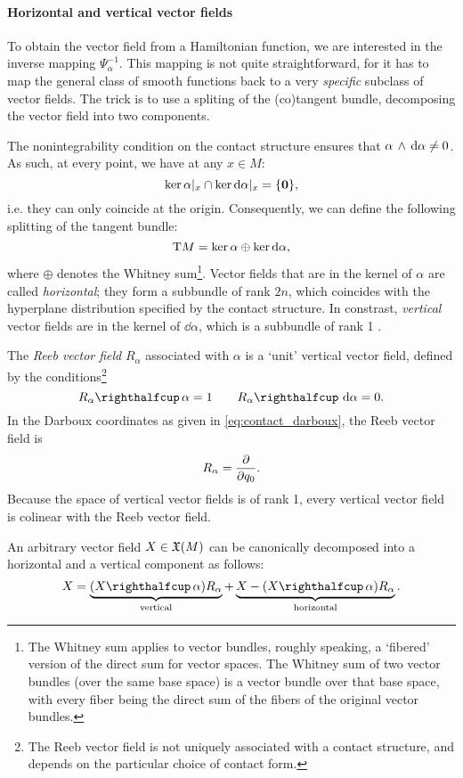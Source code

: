 \paragraph{Horizontal and vertical vector fields} To obtain the vector field from a Hamiltonian function, we are interested in the inverse mapping $\Psi^{-1}_\alpha$. This mapping is not quite straightforward, for it has to map the general class of smooth functions back to a very \emph{specific} subclass of vector fields. The trick is to use a spliting of the (co)tangent bundle, decomposing the vector field into two components. 

The nonintegrability condition on the contact structure ensures that $ \alpha\,\wedge\,\dd{\alpha}  \neq 0$. As such, at every point, we have at any $x\in M$:
$$ \ker{\alpha}\vert_x \cap \ker{\dd{\alpha}}\vert_x = \qty{\mathbf{0}}, $$
i.e. they can only coincide at the origin. Consequently, we can define the following splitting of the tangent bundle:
$$ \mathrm{T}M = \ker{\alpha}\oplus\ker{\dd{\alpha}}, $$
where $\oplus$ denotes the Whitney sum\footnote{The Whitney sum applies to vector bundles, roughly speaking, a `fibered' version of the direct sum for vector spaces. The Whitney sum of two vector bundles (over the same base space) is a vector bundle over that base space, with every fiber being the direct sum of the fibers of the original vector bundles.}. Vector fields that are in the kernel of $\alpha$ are called \emph{horizontal}; they form a subbundle of rank $2n$, which coincides with the hyperplane distribution specified by the contact structure. In constrast, \emph{vertical} vector fields are in the kernel of $\dd{\alpha}$, which is a subbundle of rank 1 \cite{Libermann1987}.

The \emph{Reeb vector field} $R_\alpha$ associated with $\alpha$ is a `unit' vertical vector field, defined by the conditions\footnote{The Reeb vector field is not uniquely associated with a contact structure, and depends on the particular choice of contact form.}
    $$ \intpr{R_\alpha}{\alpha} = 1 \qquad \intpr{R_\alpha}{\dd{\alpha}} = 0.$$
In the Darboux coordinates as given in \cref{eq:contact_darboux}, the Reeb vector field is
    $$ R_\alpha = \pdv{}{q_0}. $$ 
Because the space of vertical vector fields is of rank 1, every vertical vector field is colinear with the Reeb vector field.

An arbitrary vector field $X \in \mathfrak{X}\qty(M)$ can be canonically decomposed into a horizontal and a vertical component as follows:
\begin{equation}
    X = \underbrace{(\intpr{X}{\alpha})R_\alpha}_\text{vertical} + \underbrace{X - (\intpr{X}{\alpha})R_\alpha}_\text{horizontal}.
    \label{eq:vfield_splitting}
\end{equation}

